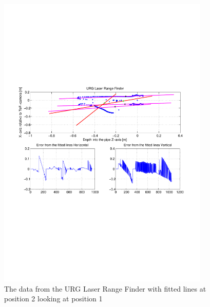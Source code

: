 \begin{figure}[htbp]
    \centering
    \includegraphics[width=0.9\textwidth]{pics/pos2-irregular-urg-2d}
    \caption{The data from the URG Laser Range Finder with fitted lines at position 2
    looking at position 1}
    \label{chap7:fig-pos2-irregular-urg-2d}
\end{figure}
